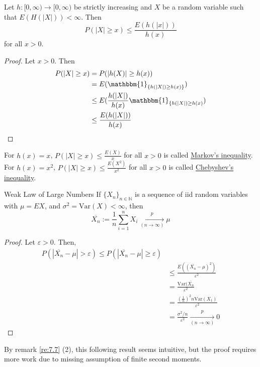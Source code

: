 \documentclass{article}
\newcommand{\N}{\mathbb{N}}
\newcommand{\Var}{\mathrm{Var}}
\begin{document}
			\begin{mylem}{}{}
				Let $h : [0, \infty)\to[0, \infty)$ be strictly increasing and $X$ be a random variable such that $E(H(|X|))<\infty$. Then $$P(|X|\geq x)\leq\frac{E(h(|x|))}{h(x)}$$ for all $x>0$.
				
				\begin{proof}
					Let $x>0$. Then
					\begin{align*}
						P(|X|\geq x)&=P(|h(X)|\geq h(x))\\
						&=E(\mathbbm{1}_{\{h(|X|)\geq h(x)\}})\\
						&\leq E(\frac{h(|X|)}{h(x)}\mathbbm{1}_{\{h(|X|)\geq h(x)})\\
						&\leq\frac{E(h(|X|))}{h(x)}
					\end{align*}
				\end{proof}
				
				For $h(x)=x$, $P(|X|\geq x)\leq\frac{E(X)}{x}$ for all $x>0$ is called \ul{Markov's inequality}. For $h(x)=x^2$, $P(|X|\geq x)\leq\frac{E(X^2)}{x^2}$ for all $x>0$ is called \ul{Chebyshev's inequality}.
			\end{mylem}
			
			\begin{myprop}{Weak Law of Large Numbers}{}
				If $\{X_n\}_{n\in\N}$ is a sequence of iid random variables with $\mu=EX$, and $\sigma^2=\Var(X)<\infty$, then
				$$\overline{X_n}:=\frac{1}{n}\sum_{i=1}^nX_i\underset{(n\to\infty)}{\overset{p}{\to}}\mu$$
				
				\begin{proof}
					Let $\varepsilon>0$. Then,
					\begin{align*}
						P(|\overline{X_n}-\mu|>\varepsilon)\leq P(|\overline{X_n}-\mu|\geq\varepsilon)\\
						&\leq\frac{E((\overline{X_n}-\mu)^2)}{\varepsilon^2}\\
						&=\frac{\Var(\overline{X_n}}{\varepsilon^2}\\
						&=\frac{(\frac{1}{n})^2n\Var(X_1)}{\varepsilon^2}\\
						&=\frac{\sigma^2/n}{\varepsilon^2}\underset{(n\to\infty)}{\overset{p}{\to}}0
					\end{align*}
				\end{proof}
			\end{myprop}
			
			By remark \ref{re:7.7} (2), this following result seems intuitive, but the proof requires more work due to missing assumption of finite second moments.
			
\end{document}
